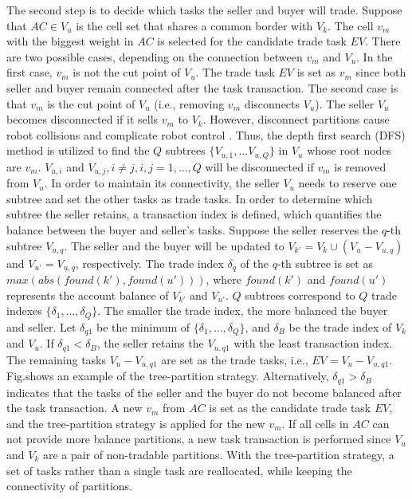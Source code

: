 \documentclass[journal,article,submit,pdftex,moreauthors]{Definitions/mdpi}
\begin{document}
The second step is to decide which tasks the seller and buyer will trade. Suppose that $AC \in V_u$ is the cell set that shares a common border with $V_k$. The cell $v_m$ with the biggest weight in $AC$ is selected for the candidate trade task $EV$. There are two possible cases, depending on the connection between $v_m$ and $V_u$. In the first case, $v_m$ is not the cut point of $V_u$. The trade task $EV$ is set as $v_m$ since both seller and buyer remain connected after the task transaction. The second case is that $v_m$ is the cut point of $V_u$ (i.e., removing $v_m$ disconnects $V_u$). The seller $V_u$ becomes disconnected if it sells $v_m$ to $V_k$. However, disconnect partitions cause robot collisions and complicate robot control \cite{c1}. Thus, the depth first search (DFS) method is utilized to find the $Q$ subtrees $\{V_{u,1}, ...V_{u, Q}\}$ in $V_u$ whose root nodes are $v_m$. $V_{u,i}$ and $V_{u,j}, i \neq j, i,j=1,...,Q$ will be disconnected if $v_m$ is removed from $V_u$. In order to maintain its connectivity, the seller $V_u$ needs to reserve one subtree and set the other tasks as trade tasks. In order to determine which subtree the seller retains, a transaction index is defined, which quantifies the balance between the buyer and seller's tasks. Suppose the seller reserves the $q$-th subtree $V_{u,q}$. The seller and the buyer will be updated to $V_{k'} = V_k \cup (V_u - V_{u,q})$ and $V_{u'} = V_{u,q}$, respectively. The trade index $\delta_q$ of the $q$-th subtree is set as $max(abs(found(k'),found(u')))$, where $found(k')$ and $found(u')$ represents the account balance of $V_{k'}$ and $V_{u'}$. $Q$ subtrees correspond to $Q$ trade indexes $\{\delta_1,...,\delta_Q\}$. The smaller the trade index, the more balanced the buyer and seller. Let $\delta_{q1}$ be the minimum of $\{\delta_1,...,\delta_Q\}$, and $\delta_B$ be the trade index of $V_k$ and $V_u$. If $\delta_{q1} < \delta_B$, the seller retains the $V_{u,q1}$ with the least transaction index. The remaining tasks $V_u - V_{u,q1}$ are set as the trade tasks, i.e., $EV = V_u - V_{u,q1}$. Fig.\replaced{\ref{Fig_6}}{\ref{Eq.c6}}shows an example of the tree-partition strategy. Alternatively, $\delta_{q1} > \delta_B$ indicates that the tasks of the seller and the buyer do not become balanced after the task transaction. A new $v_m$ from $AC$ is set as the candidate trade task $EV$, and the tree-partition strategy is applied for the new $v_m$. If all cells in $AC$ can not provide more balance partitions, a new task transaction is performed since $V_u$ and $V_k$ are a pair of non-tradable partitions. With the tree-partition strategy, a set of tasks rather than a single task are reallocated, while keeping the connectivity of partitions.
\end{document}
